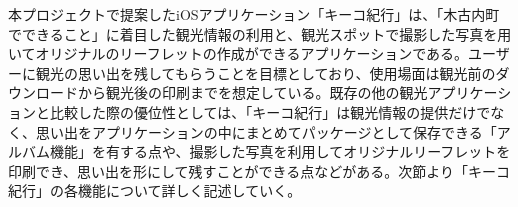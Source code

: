 本プロジェクトで提案したiOSアプリケーション「キーコ紀行」は、「木古内町でできること」に着目した観光情報の利用と、観光スポットで撮影した写真を用いてオリジナルのリーフレットの作成ができるアプリケーションである。ユーザーに観光の思い出を残してもらうことを目標としており、使用場面は観光前のダウンロードから観光後の印刷までを想定している。既存の他の観光アプリケーションと比較した際の優位性としては、「キーコ紀行」は観光情報の提供だけでなく、思い出をアプリケーションの中にまとめてパッケージとして保存できる「アルバム機能」を有する点や、撮影した写真を利用してオリジナルリーフレットを印刷でき、思い出を形にして残すことができる点などがある。次節より「キーコ紀行」の各機能について詳しく記述していく。
